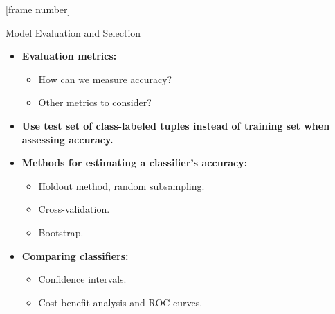 \documentclass[aspectratio=169,t,table]{beamer}
\begin{document}
  {
    [frame number]
    \begin{frame}{Model Evaluation and Selection}
        \begin{itemize}
          \item \textbf{Evaluation metrics:}
          \begin{itemize}
            \item How can we measure accuracy?
            \item Other metrics to consider?
          \end{itemize}
          \item \textbf{Use {\color{airforceblue}test} set of class-labeled tuples instead of training set when assessing accuracy.}
          \item \textbf{Methods for estimating a classifier's accuracy:}
          \begin{itemize}
            \item Holdout method, random subsampling.
            \item Cross-validation.
            \item Bootstrap.
          \end{itemize}
          \item \textbf{Comparing classifiers:}
          \begin{itemize}
            \item Confidence intervals.
            \item Cost-benefit analysis and ROC curves.
          \end{itemize}
        \end{itemize}
    \end{frame}
  }
\end{document}
